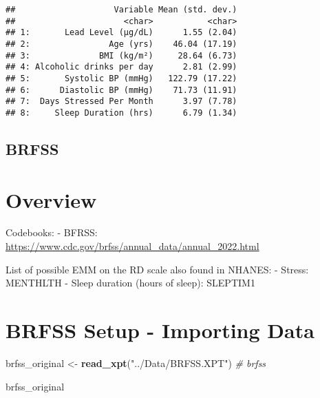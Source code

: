 \documentclass[
]{article}
\newenvironment{Shaded}{\begin{snugshade}}{\end{snugshade}}
\newcommand{\CommentTok}[1]{\textcolor[rgb]{0.56,0.35,0.01}{\textit{#1}}}
\newcommand{\FunctionTok}[1]{\textcolor[rgb]{0.13,0.29,0.53}{\textbf{#1}}}
\newcommand{\NormalTok}[1]{#1}
\newcommand{\OtherTok}[1]{\textcolor[rgb]{0.56,0.35,0.01}{#1}}
\newcommand{\StringTok}[1]{\textcolor[rgb]{0.31,0.60,0.02}{#1}}
\begin{document}
\begin{verbatim}
##                    Variable Mean (std. dev.)
##                      <char>           <char>
## 1:       Lead Level (μg/dL)      1.55 (2.04)
## 2:                Age (yrs)    46.04 (17.19)
## 3:              BMI (kg/m²)     28.64 (6.73)
## 4: Alcoholic drinks per day      2.81 (2.99)
## 5:       Systolic BP (mmHg)   122.79 (17.22)
## 6:      Diastolic BP (mmHg)    71.73 (11.91)
## 7:  Days Stressed Per Month      3.97 (7.78)
## 8:     Sleep Duration (hrs)      6.79 (1.34)
\end{verbatim}

\subsection{BRFSS}\label{brfss}

\section{Overview}\label{overview-1}

Codebooks: - BFRSS:
\url{https://www.cdc.gov/brfss/annual_data/annual_2022.html}

List of possible EMM on the RD scale also found in NHANES: - Stress:
MENTHLTH - Sleep duration (hours of sleep): SLEPTIM1

\section{BRFSS Setup - Importing
Data}\label{brfss-setup---importing-data}

\begin{Shaded}
\begin{Highlighting}[]
\NormalTok{brfss\_original }\OtherTok{\textless{}{-}} \FunctionTok{read\_xpt}\NormalTok{(}\StringTok{"../Data/BRFSS.XPT"}\NormalTok{)}
\CommentTok{\# brfss}

\NormalTok{brfss\_original}
\end{Highlighting}
\end{Shaded}
\end{document}
